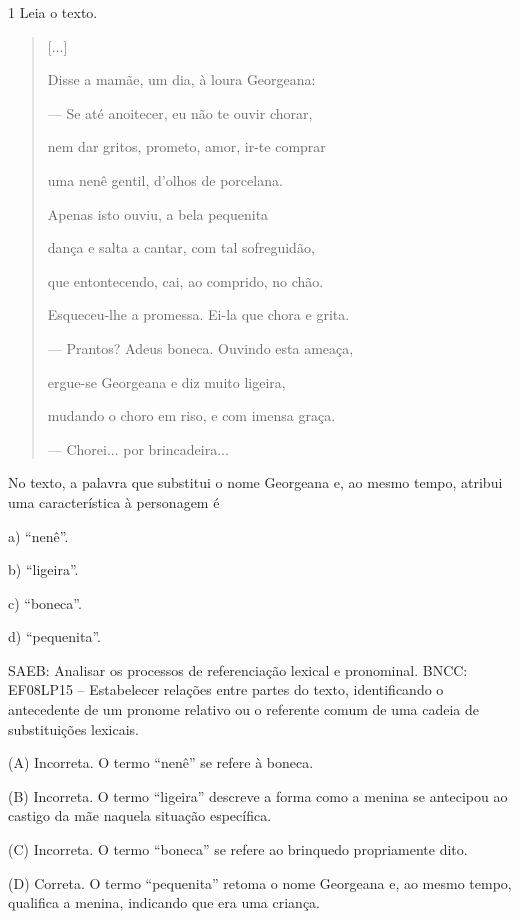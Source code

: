 
\num{1} Leia o texto.

\begin{quote}
{[}...{]}

Disse a mamãe, um dia, à loura Georgeana:

--- Se até anoitecer, eu não te ouvir chorar,

nem dar gritos, prometo, amor, ir-te comprar

uma nenê gentil, d'olhos de porcelana.

Apenas isto ouviu, a bela pequenita

dança e salta a cantar, com tal sofreguidão,

que entontecendo, cai, ao comprido, no chão.

Esqueceu-lhe a promessa. Ei-la que chora e grita.

--- Prantos? Adeus boneca. Ouvindo esta ameaça,

ergue-se Georgeana e diz muito ligeira,

mudando o choro em riso, e com imensa graça.

--- Chorei... por brincadeira...
\end{quote}


No texto, a palavra que substitui o nome Georgeana e, ao mesmo tempo,
atribui uma característica à personagem é

a) ``nenê''.

b) ``ligeira''.

c) ``boneca''.

d) ``pequenita''.

SAEB: Analisar os processos de referenciação lexical e pronominal. BNCC:
EF08LP15 -- Estabelecer relações entre partes do texto, identificando o
antecedente de um pronome relativo ou o referente comum de uma cadeia de
substituições lexicais.

(A) Incorreta. O termo ``nenê'' se refere à boneca.

(B) Incorreta. O termo ``ligeira'' descreve a forma como a menina se
antecipou ao castigo da mãe naquela situação específica.

(C) Incorreta. O termo ``boneca'' se refere ao brinquedo propriamente
dito.

(D) Correta. O termo ``pequenita'' retoma o nome Georgeana e, ao mesmo
tempo, qualifica a menina, indicando que era uma criança.

